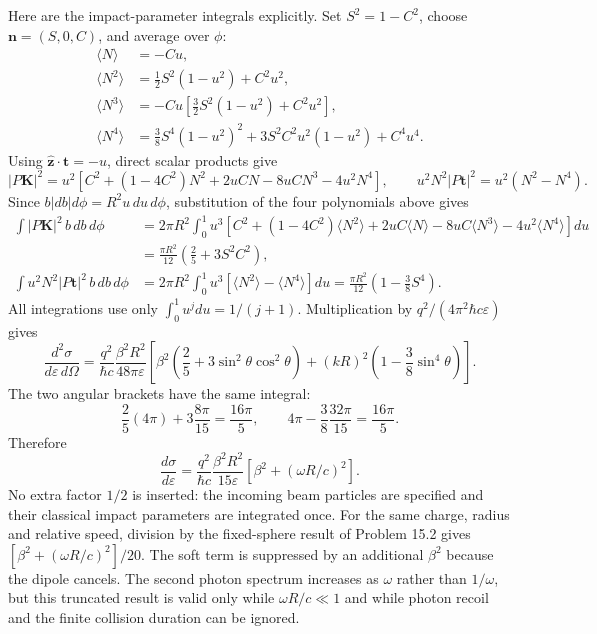 Here are the impact-parameter integrals explicitly.  Set
$S^2=1-C^2$, choose $\mathbf n=(S,0,C)$, and average over $\phi$:
\begin{align*}
\langle N\rangle&=-Cu,\\
\langle N^2\rangle&=\tfrac12S^2(1-u^2)+C^2u^2,\\
\langle N^3\rangle&=-Cu[\tfrac32S^2(1-u^2)+C^2u^2],\\
\langle N^4\rangle&=\tfrac38S^4(1-u^2)^2
 +3S^2C^2u^2(1-u^2)+C^4u^4.
\end{align*}
Using $\widehat{\mathbf z}\cdot\mathbf t=-u$, direct scalar products
give
\[
|P\mathbf K|^2=u^2[C^2+(1-4C^2)N^2+2uCN
 -8uCN^3-4u^2N^4],\qquad
u^2N^2|P\mathbf t|^2=u^2(N^2-N^4).
\]
Since $b|db|d\phi=R^2u\,du\,d\phi$, substitution of the four
polynomials above gives
\begin{align*}
\int |P\mathbf K|^2\,b\,db\,d\phi
&=2\pi R^2\int_0^1u^3
 [C^2+(1-4C^2)\langle N^2\rangle+2uC\langle N\rangle
 -8uC\langle N^3\rangle-4u^2\langle N^4\rangle]du\\
&=\frac{\pi R^2}{12}\left(\frac25+3S^2C^2\right),\\
\int u^2N^2|P\mathbf t|^2\,b\,db\,d\phi
&=2\pi R^2\int_0^1u^3[\langle N^2\rangle-\langle N^4\rangle]du
=\frac{\pi R^2}{12}\left(1-\frac38S^4\right).
\end{align*}
All integrations use only $\int_0^1u^jdu=1/(j+1)$.
Multiplication by $q^2/(4\pi^2\hbar c\varepsilon)$ gives
\[
\boxed{\frac{d^2\sigma}{d\varepsilon\,d\Omega}
=\frac{q^2}{\hbar c}\frac{\beta^2R^2}{48\pi\varepsilon}
\left[\beta^2\left(\frac25+3\sin^2\theta\cos^2\theta\right)
 +(kR)^2\left(1-\frac38\sin^4\theta\right)\right].}
\]
The two angular brackets have the same integral:
\[
\frac25(4\pi)+3\frac{8\pi}{15}=\frac{16\pi}5,
\qquad
4\pi-\frac38\frac{32\pi}{15}=\frac{16\pi}5.
\]
Therefore
\[
\boxed{\frac{d\sigma}{d\varepsilon}
=\frac{q^2}{\hbar c}\frac{\beta^2R^2}{15\varepsilon}
 [\beta^2+(\omega R/c)^2].}
\]
No extra factor $1/2$ is inserted: the incoming beam particles are
specified and their classical impact parameters are integrated once.
For the same charge, radius and relative speed, division by the
fixed-sphere result of Problem 15.2 gives
$[\beta^2+(\omega R/c)^2]/20$.  The soft term is suppressed by an
additional $\beta^2$ because the dipole cancels.  The second photon
spectrum increases as $\omega$ rather than $1/\omega$, but this
truncated result is valid only while $\omega R/c\ll1$ and while
photon recoil and the finite collision duration can be ignored.


